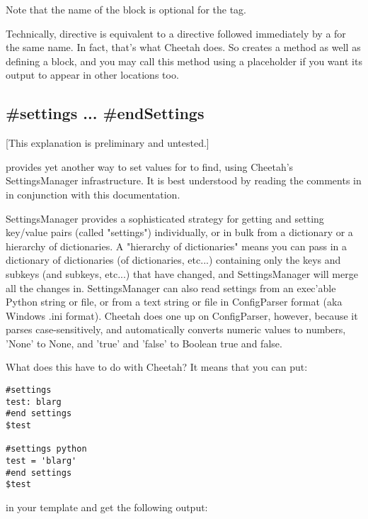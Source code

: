 Note that the name of the block is optional for the  tag.

Technically,  directive is equivalent to a  directive followed
immediately by a  for the same name.  In fact, that's what Cheetah does.
So  creates a method as well as defining a block, and you may call this method
using a placeholder if you want its output to appear in other locations too.



\subsection{\#settings ... \#endSettings}
\label{inheritanceEtc.settings}

[This explanation is preliminary and untested.]

 provides yet another way to set values for
 to find, using Cheetah's SettingsManager infrastructure.
It is best understood by reading the comments in
 in conjunction with this documentation.

SettingsManager provides a sophisticated strategy for getting and setting
key/value pairs (called "settings") individually, or in bulk from a dictionary
or a hierarchy of dictionaries.  A "hierarchy of dictionaries" means you can
pass in a dictionary of dictionaries (of dictionaries, etc...) containing only
the keys and subkeys (and subkeys, etc...) that have changed, and
SettingsManager will merge all the changes in.  SettingsManager can also read
settings from an exec'able Python string or file, or from a text string or file in ConfigParser format (aka Windows .ini format).  Cheetah does one up on 
ConfigParser, however, because it parses case-sensitively, and automatically
converts numeric values to numbers, 'None' to None, and 'true' and 'false' to
Boolean true and false.  

What does this have to do with Cheetah?  It means that you can put:

\begin{verbatim}
#settings
test: blarg
#end settings
$test

#settings python
test = 'blarg'
#end settings
$test
\end{verbatim}

in your template and get the following output:

